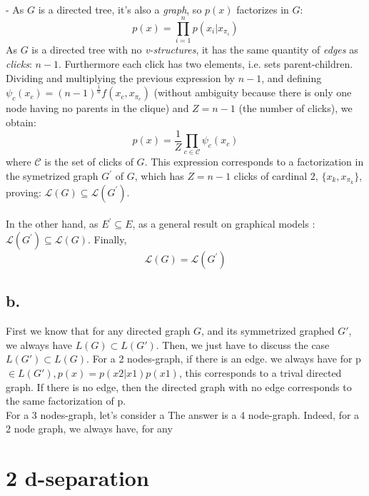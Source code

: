 \documentclass[12pt]{article}
\begin{document}
~\\
- As $G$ is a directed tree, it's also a \emph{graph}, so $p(x)$ factorizes in $G$:
$$p(x) = \prod^n_{i=1}p(x_i|x_{\pi_i})$$
As $G$ is a directed tree with no \emph{v-structures}, it has the same quantity of \emph{edges} as \emph{clicks}: $n-1$. Furthermore each click has two elements, i.e. sets parent-children. Dividing and multiplying the previous expression by $n-1$, and defining $\psi_{c}(x_{c}) = (n-1)^{\frac{1}{n}}f(x_c,x_{\pi_c})$ (without ambiguity because there is only one node having no parents in the clique) and $Z=n-1$ (the number of clicks), we obtain:
$$p(x) = \frac{1}{Z}\prod_{c\in \mathcal{C}}\psi_c(x_c)$$
where $\mathcal{C}$ is the set of clicks of $G$. This expression corresponds to a factorization in the symetrized graph $G^\prime$ of $G$, which has $Z=n-1$ clicks of cardinal $2$, $\{x_k, x_{\pi_k}\}$, proving: $\mathcal{L}(G)\subseteq \mathcal{L}(G^\prime)$.
~\\
~\\
In the other hand, as $E^\prime \subseteq E$, as a general result on graphical models : $\mathcal{L}(G^\prime)\subseteq \mathcal{L}(G)$.
Finally, $$\boxed{\mathcal{L}(G) = \mathcal{L}(G^\prime)}$$

\subsection*{b.}
First we know that for any directed graph $G$, and its symmetrized graphed $G'$, we always have $L(G)\subset L(G')$. Then, we just have to discuss the case $L(G') \subset  L(G)$.
For a 2 nodes-graph, if there is an edge. we always have for p $\in L(G'), p(x)=p(x2|x1)p(x1)$, this corresponds to a trival directed graph. If there is no edge, then the directed graph with no edge corresponds to the same factorization of p.~\\
For a 3 nodes-graph, let's consider a
The answer is a 4 node-graph.
Indeed, for a 2 node graph, we always have, for any 
\section*{2 d-separation}
\end{document}
